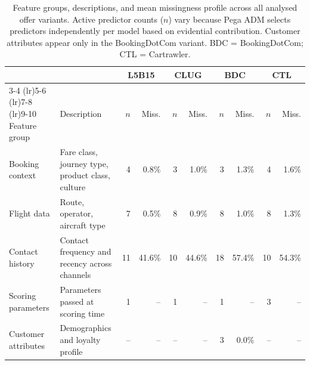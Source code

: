 \begin{table}[ht]
\caption{Feature groups, descriptions, and mean missingness profile across all analysed offer variants. Active predictor counts ($n$) vary because Pega ADM selects predictors independently per model based on evidential contribution. Customer attributes appear only in the BookingDotCom variant. BDC = BookingDotCom; CTL = Cartrawler.}
\label{tab:missingness}
\centering
\scriptsize
\begin{tabular}{lp{3.2cm}rrrrrrrr}
\toprule
 & & \multicolumn{2}{c}{L5B15} & \multicolumn{2}{c}{CLUG} & \multicolumn{2}{c}{BDC} & \multicolumn{2}{c}{CTL} \\
\cmidrule(lr){3-4} \cmidrule(lr){5-6} \cmidrule(lr){7-8} \cmidrule(lr){9-10}
Feature group & Description & $n$ & Miss. & $n$ & Miss. & $n$ & Miss. & $n$ & Miss. \\
\midrule
Booking context & Fare class, journey type, product class, culture & 4 & 0.8\% & 3 & 1.0\% & 3 & 1.3\% & 4 & 1.6\% \\
Flight data & Route, operator, aircraft type & 7 & 0.5\% & 8 & 0.9\% & 8 & 1.0\% & 8 & 1.3\% \\
Contact history & Contact frequency and recency across channels & 11 & 41.6\% & 10 & 44.6\% & 18 & 57.4\% & 10 & 54.3\% \\
Scoring parameters & Parameters passed at scoring time & 1 & -- & 1 & -- & 1 & -- & 3 & -- \\
Customer attributes & Demographics and loyalty profile & -- & -- & -- & -- & 3 & 0.0\% & -- & -- \\
\bottomrule
\end{tabular}
\end{table}
